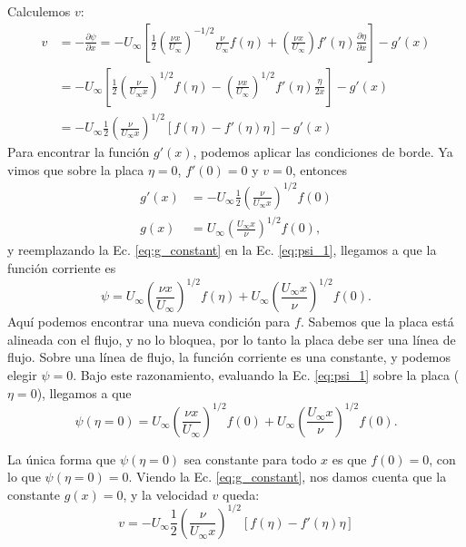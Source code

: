 Calculemos $v$:
%
\begin{align}
v &= -\frac{\partial\psi}{\partial x} = -U_\infty\left[\frac{1}{2}\left(\frac{\nu x}{U_\infty}\right)^{-1/2}\frac{\nu}{U_\infty}f(\eta) + \left(\frac{\nu x}{U_\infty}\right)f'(\eta)\frac{\partial \eta}{\partial x}\right] - g'(x) \nonumber\\
& = -U_\infty\left[\frac{1}{2}\left(\frac{\nu}{U_\infty x}\right)^{1/2} f(\eta) - \left(\frac{\nu x}{U_\infty}\right)^{1/2}f'(\eta)\frac{\eta}{2x}\right] - g'(x) \nonumber\\  
& = -U_\infty\frac{1}{2}\left(\frac{\nu}{U_\infty x}\right)^{1/2} \left[f(\eta) - f'(\eta)\eta\right] - g'(x)
\end{align}
%
Para encontrar la función $g'(x)$, podemos aplicar las condiciones de borde.
Ya vimos que sobre la placa $\eta=0$, $f'(0)=0$ y $v=0$, entonces
%
\begin{align}\label{eq:g_constant}
 g'(x) &= -U_\infty\frac{1}{2}\left(\frac{\nu}{U_\infty x}\right)^{1/2} f(0) \nonumber\\
g(x) &= U_\infty\left(\frac{U_\infty x}{\nu}\right)^{1/2}f(0),
\end{align}
%
y reemplazando la Ec. \eqref{eq:g_constant} en la Ec. \eqref{eq:psi_1}, llegamos a que la función corriente es
%
\begin{equation}
\psi = U_\infty \left(\frac{\nu x}{U_\infty}\right)^{1/2}f(\eta) + U_\infty\left(\frac{U_\infty x}{\nu}\right)^{1/2}f(0).
\end{equation}
%
Aquí podemos encontrar una nueva condición para $f$. 
Sabemos que la placa está alineada con el flujo, y no lo bloquea, por lo tanto la placa debe ser una línea de flujo.
Sobre una línea de flujo, la función corriente es una constante, y podemos elegir $\psi=0$.
Bajo este razonamiento, evaluando la Ec. \eqref{eq:psi_1} sobre la placa ($\eta=0$), llegamos a que 
%
\begin{equation}
\psi(\eta=0) = U_\infty \left(\frac{\nu x}{U_\infty}\right)^{1/2}f(0) + U_\infty\left(\frac{U_\infty x}{\nu}\right)^{1/2}f(0).
\end{equation}

La única forma que $\psi(\eta=0)$ sea constante para todo $x$ es que $f(0)=0$, con lo que $\psi(\eta=0)=0$.
Viendo la Ec. \eqref{eq:g_constant}, nos damos cuenta que la constante $g(x)=0$, y la velocidad $v$ queda:
%
\begin{equation}\label{eq:v_blasius}
v = -U_\infty\frac{1}{2}\left(\frac{\nu}{U_\infty x}\right)^{1/2} \left[f(\eta) - f'(\eta)\eta\right] 
\end{equation}

